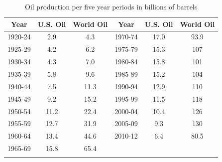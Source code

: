 \documentclass
[justified,nohyper]
{tufte-handout}
\begin{document}
\begin{fullwidth}
\begin{table}
\begin{tabular}{ccc||ccc}
\toprule
Year & U.S. Oil & World Oil & Year & U.S. Oil & World Oil \\
\midrule
1920-24 & 2.9 & 4.3 & 1970-74 & 17.0 & 93.9 \\
1925-29 & 4.2 & 6.2 & 1975-79 & 15.3 & 107 \\
1930-34 & 4.3 & 7.0 & 1980-84 & 15.8 & 101 \\
1935-39 & 5.8 & 9.6 & 1985-89 & 15.2 & 104 \\
1940-44 & 7.5 & 11.3 & 1990-94 & 12.9 & 110 \\
1945-49 & 9.2 & 15.2 & 1995-99 & 11.5 & 118 \\
1950-54 & 11.2 & 22.4 & 2000-04 & 10.4 & 126 \\
1955-59 & 12.7 & 31.9 & 2005-09 & 9.3 &  130\\
1960-64 & 13.4 & 44.6 & 2010-12 & 6.4 &  80.5 \\
1965-69 & 15.8 & 65.4 &         &     &     \\
\bottomrule
\caption{\label{oil1} Oil production per five year periods in billions of barrels}
\end{tabular}
\end{table}
\end{fullwidth}
\end{document}

